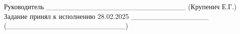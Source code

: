 \documentclass[12pt,a4paper]{extarticle}
\begin{document}
\raggedright

\vspace{\baselineskip}

\begin{varwidth}{\textwidth}
    Руководитель \hspace{5ex} \_\_\_\_\_\_\_\_\_\_\_\_\_\_\_\_\_\_\_\_\_\_\_\_\_\_\_ (Крупенич Е.Г.) \\
    Задание принял к исполнению 28.02.2025 \hfill \_\_\_\_\_\_\_\_\_\_\_\_\_\_\_ \\
    (\_\_\_\_\_\_\_\_\_\_\_\_\_\_\_\_\_\_\_\_\_\_\_) \\
\end{varwidth}
\end{document}
